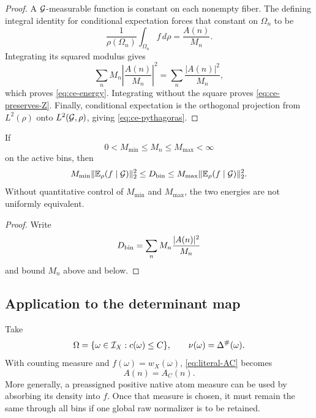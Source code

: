 \begin{proof}
A \(\mathcal G\)-measurable function is constant on each nonempty fiber.
The defining integral identity for conditional expectation forces
that constant on \(\Omega_n\) to be
\[
 \frac{1}{\rho(\Omega_n)}\int_{\Omega_n}f\,d\rho
 =\frac{A(n)}{M_n}.
\]
Integrating its squared modulus gives
\[
 \sum_nM_n\left|\frac{A(n)}{M_n}\right|^2
 =\sum_n\frac{|A(n)|^2}{M_n},
\]
which proves \eqref{eq:ce-energy}.  Integrating without the square
proves \eqref{eq:ce-preserves-Z}.  Finally, conditional expectation
is the orthogonal projection from \(L^2(\rho)\) onto
\(L^2(\mathcal G,\rho)\), giving \eqref{eq:ce-pythagoras}.
\end{proof}

\begin{corollary}
\label{cor:ce-mass-comparison}
If
\[
 0<M_{\min}\le M_n\le M_{\max}<\infty
\]
on the active bins, then
\begin{equation}
 M_{\min}\|\mathbb E_\rho(f\mid\mathcal G)\|_2^2
 \le D_{\rm bin}
 \le
 M_{\max}\|\mathbb E_\rho(f\mid\mathcal G)\|_2^2.
 \label{eq:ce-mass-comparison}
\end{equation}
Without quantitative control of \(M_{\min}\) and \(M_{\max}\), the
two energies are not uniformly equivalent.
\end{corollary}

\begin{proof}
Write
\[
 D_{\rm bin}
 =\sum_n M_n\frac{|A(n)|^2}{M_n}
\]
and bound \(M_n\) above and below.
\end{proof}

\subsection{Application to the determinant map}

Take
\[
 \Omega
 =\{\omega\in\mathcal I_X:c(\omega)\le C\},
 \qquad
 \nu(\omega)=\Delta^\#(\omega).
\]
With counting measure and \(f(\omega)=w_X(\omega)\),
\eqref{eq:literal-AC} becomes
\[
 A(n)=A_C(n).
\]
More generally, a preassigned positive native atom measure can be
used by absorbing its density into \(f\).  Once that measure is
chosen, it must remain the same through all bins if one global raw
normalizer is to be retained.

